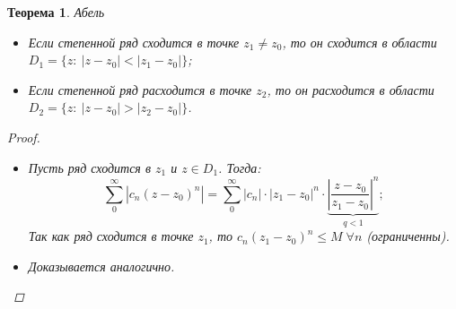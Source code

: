 \documentclass[a4paper,12pt]{article}
\newtheorem*{theorem}{Теорема}
\theoremstyle{remark}
\theoremstyle{definition}
\begin{document}
\begin{theorem}{Абель}
    \begin{itemize}
        \item Если степенной ряд сходится в точке \(z_1 \neq z_0\), то он сходится в области \({D_1 = \{z:\: |z - z_0| < |z_1 - z_0|\}}\);
        \item Если степенной ряд расходится в точке \(z_2\), то он расходится в области \({D_2 = \{z:\: |z - z_0| > |z_2 - z_0|\}}\).
    \end{itemize}

    \begin{proof}\(\)
        \begin{itemize}
            \item Пусть ряд сходится в \(z_1\) и \(z \in D_1\). Тогда:
            \begin{equation} \label{eq:1}
                \sum_0^\infty |c_n (z - z_0)^n | = \sum_0^\infty |c_n| \cdot |z_1 - z_0|^n \cdot \underbrace{\left| \frac{z - z_0}{z_1 - z_0} \right|^n}_{q < 1};
            \end{equation}
            Так как ряд сходится в точке \(z_1\), то \(c_n(z_1 - z_0)^n \leqslant M \;\forall n\) (ограниченны).
            \item Доказывается аналогично.
        \end{itemize}
    \end{proof}
\end{theorem}
\end{document}
